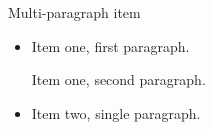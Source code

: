 \documentclass[14pt,t]{beamer}
\begin{document}
\begin{frame}{Multi-paragraph item}
\begin{itemize}
\item Item one, first paragraph.

Item one, second paragraph.
\item Item two, single paragraph.
\end{itemize}
\end{frame}
\end{document}
